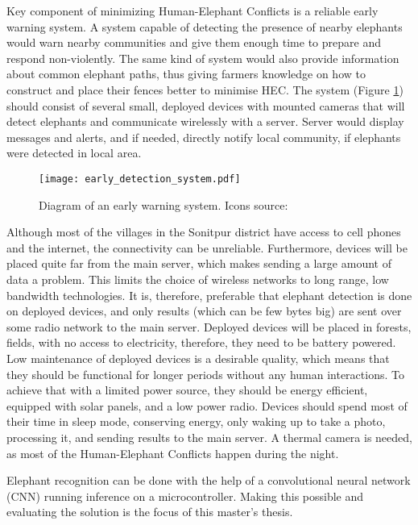 Key component of minimizing Human-Elephant Conflicts is a reliable early warning system. 
A system capable of detecting the presence of nearby elephants would warn nearby communities and give them enough time to prepare and respond non-violently.
The same kind of system would also provide information about common elephant paths, thus giving farmers knowledge on how to construct and place their fences better to minimise HEC.
The system (Figure \ref{early_detection_system_diagram}) should consist of several small, deployed devices with mounted cameras that will detect elephants and communicate wirelessly with a server.
Server would display messages and alerts, and if needed, directly notify local community, if elephants were detected in local area.

\begin{figure}[ht]
        \centering
        \texttt{[image: early\_detection\_system.pdf]} 
        \caption[Diagram of an early warning system.]{Diagram of an early warning system. Icons source:\cite{icons}}
        \label{early_detection_system_diagram}
\end{figure}

Although most of the villages in the Sonitpur district have access to cell phones and the internet, the connectivity can be unreliable\cite{wildlabs-elephants}. 
Furthermore, devices will be placed quite far from the main server, which makes sending a large amount of data a problem. 
This limits the choice of wireless networks to long range, low bandwidth technologies.
It is, therefore, preferable that elephant detection is done on deployed devices, and only results (which can be few bytes big) are sent over some radio network to the main server.
Deployed devices will be placed in forests, fields, with no access to electricity, therefore, they need to be battery powered.
Low maintenance of deployed devices is a desirable quality, which means that they should be functional for longer periods without any human interactions.
To achieve that with a limited power source, they should be energy efficient, equipped with solar panels, and a low power radio.
Devices should spend most of their time in sleep mode, conserving energy, only waking up to take a photo, processing it, and sending results to the main server.
A thermal camera is needed, as most of the Human-Elephant Conflicts happen during the night\cite{wildlabs-elephants}.

Elephant recognition can be done with the help of a convolutional neural network (CNN) running inference on a microcontroller. 
Making this possible and evaluating the solution is the focus of this master's thesis.


